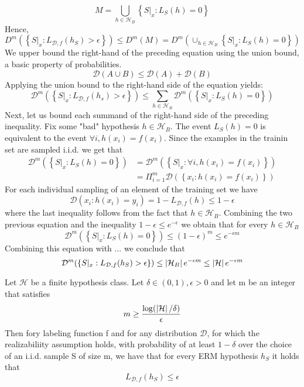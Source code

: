 \[ 
    M = \bigcup_{h\in\mathcal{H}_B}\left\{ S\rvert_x : L_S(h) = 0 \right\} 
\]
Hence,
\[ 
    D^m(\left\{ S\rvert_x:L_{\mathcal{D},f}(h_S) > \epsilon \right\})\leq D^m(M) = D^m(\cup_{h\in\mathcal{H}_B}\left\{ S\rvert_x : L_S(h) =0 \right\}) 
\]
We upper bound the right-hand of the preceding equation using the union bound, a basic property of probabilities.
\[ 
    \mathcal{D}(A \cup B ) \leq \mathcal{D}(A)+\mathcal{D}(B) 
\]Applying the union bound to the right-hand side of the equation yields:
\begin{equation}
    \mathcal{D}^m(\left\{ S\rvert_x: L_{\mathcal{D},f}(h_s)>\epsilon \right\})\leq \sum_{h\in\mathcal{H}_B}{\mathcal{D}^m(\left\{ S\rvert_x : L_S(h) = 0 \right\})}
\end{equation}
Next, let us bound each summand of the right-hand side of the preceding inequality. Fix some "bad" hypothesis $h \in \mathcal{H}_B$. The event $L_S(h) = 0$ is equivalent to the event $\forall i, h(x_i) = f(x_i)$. Since the examples in the trainin set are sampled i.i.d. we get that
\begin{align*}
    \mathcal{D}^m(\left\{ S\rvert_x : L_S(h) = 0 \right\}) &= \mathcal{D}^m(\left\{ S\rvert_x : \forall i,h(x_i) = f(x_i) \right\})\\
    & = \Pi_{i=1}^{m}{\mathcal{D}(\left\{ x_i: h(x_i) = f(x_i) \right\})}
\end{align*}
For each individual sampling of an element of the training set we have
\[ 
    \mathcal{D}({x_i:h(x_i) = y_i}) =1 - L_{\mathcal{D},f}(h) \leq 1-\epsilon
\]
where the last inequality follows from the fact that $h\in \mathcal{H}_B$. Combining the two previous equation and the inequality $1-\epsilon \leq e^{-\epsilon}$ we obtain that for every $h\in\mathcal{H}_B$
\[ 
    \mathcal{D}^m(\left\{ S\rvert_x : L_S(h) = 0 \right\}) \leq (1-\epsilon)^m \leq e^{-\epsilon m}
\]Combining this equation with ... we conclude that
\[ 
    \mathcal{D}^m(\left\{ S\rvert_x : L_{\mathcal{D},f}(h_S) > \epsilon \right\}) \leq \left\lvert\mathcal{H}_B\right\rvert e^{-\epsilon m}\leq \left\lvert\mathcal{H}\right\rvert e^{-\epsilon m}
\]
\begin{corollary}
    Let $\mathcal{H}$ be a finite hypothesis class. Let $\delta \in (0,1), \epsilon >0$ and let m be an integer that satisfies
    \[ 
        m\geq \frac{\log(\left\lvert\mathcal{H}\right\rvert/\delta)}{\epsilon} 
    \]
    Then fory labeling function f and for any distribution $\mathcal{D}$, for which the realizabiliity assumption holds, with probability of at least $1-\delta$ over the choice of an i.i.d. sample S of size m, we have that for every ERM hypothesis $h_S$ it holds that
    \[ 
        L_{\mathcal{D},f}(h_S) \leq \epsilon 
    \]
\end{corollary}
